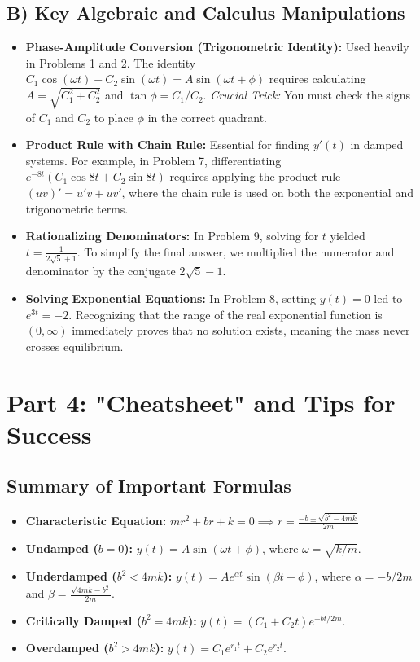 \documentclass[11pt]{article}
\begin{document}
\subsection{B) Key Algebraic and Calculus Manipulations}
\begin{itemize}
    \item \textbf{Phase-Amplitude Conversion (Trigonometric Identity):} Used heavily in Problems 1 and 2. The identity $C_1 \cos(\omega t) + C_2 \sin(\omega t) = A \sin(\omega t + \phi)$ requires calculating $A = \sqrt{C_1^2 + C_2^2}$ and $\tan \phi = C_1/C_2$. \textit{Crucial Trick:} You must check the signs of $C_1$ and $C_2$ to place $\phi$ in the correct quadrant.
    \item \textbf{Product Rule with Chain Rule:} Essential for finding $y'(t)$ in damped systems. For example, in Problem 7, differentiating $e^{-8t}(C_1 \cos 8t + C_2 \sin 8t)$ requires applying the product rule $(uv)' = u'v + uv'$, where the chain rule is used on both the exponential and trigonometric terms.
    \item \textbf{Rationalizing Denominators:} In Problem 9, solving for $t$ yielded $t = \frac{1}{2\sqrt{5} + 1}$. To simplify the final answer, we multiplied the numerator and denominator by the conjugate $2\sqrt{5} - 1$.
    \item \textbf{Solving Exponential Equations:} In Problem 8, setting $y(t) = 0$ led to $e^{3t} = -2$. Recognizing that the range of the real exponential function is $(0, \infty)$ immediately proves that no solution exists, meaning the mass never crosses equilibrium.
\end{itemize}

\newpage
\section{Part 4: "Cheatsheet" and Tips for Success}

\subsection{Summary of Important Formulas}
\begin{itemize}
    \item \textbf{Characteristic Equation:} $mr^2 + br + k = 0 \implies r = \frac{-b \pm \sqrt{b^2 - 4mk}}{2m}$
    \item \textbf{Undamped ($b=0$):} $y(t) = A \sin(\omega t + \phi)$, where $\omega = \sqrt{k/m}$.
    \item \textbf{Underdamped ($b^2 < 4mk$):} $y(t) = A e^{\alpha t} \sin(\beta t + \phi)$, where $\alpha = -b/2m$ and $\beta = \frac{\sqrt{4mk - b^2}}{2m}$.
    \item \textbf{Critically Damped ($b^2 = 4mk$):} $y(t) = (C_1 + C_2 t)e^{-bt/2m}$.
    \item \textbf{Overdamped ($b^2 > 4mk$):} $y(t) = C_1 e^{r_1 t} + C_2 e^{r_2 t}$.
\end{itemize}
\end{document}
